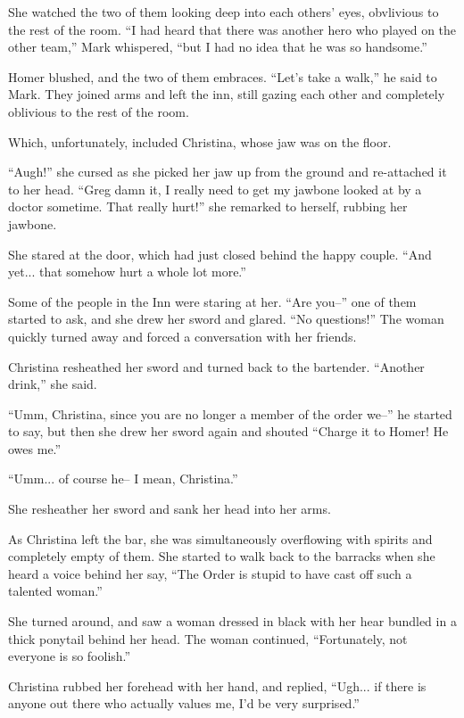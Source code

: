 \documentclass[showtrims,b6paper,draft,10pt]{memoir}
\begin{document}
She watched the two of them looking deep into each others' eyes, obvlivious to the rest of the room.  ``I had heard that there was another hero who played on the other team,'' Mark whispered, ``but I had no idea that he was so handsome.''

Homer blushed, and the two of them embraces.  ``Let's take a walk,'' he said to Mark.  They joined arms and left the inn, still gazing each other and completely oblivious to the rest of the room.

Which, unfortunately, included Christina, whose jaw was on the floor.

``Augh!'' she cursed as she picked her jaw up from the ground and re-attached it to her head.  ``Greg damn it, I really need to get my jawbone looked at by a doctor sometime.  That really hurt!''  she remarked to herself, rubbing her jawbone.

She stared at the door, which had just closed behind the happy couple.  ``And yet... that somehow hurt a whole lot more.''

Some of the people in the Inn were staring at her.  ``Are you--'' one of them started to ask, and she drew her sword and glared.  ``No questions!''  The woman quickly turned away and forced a conversation with her friends.

Christina resheathed her sword and turned back to the bartender.  ``Another drink,'' she said.

``Umm, Christina, since you are no longer a member of the order we--'' he started to say, but then she drew her sword again and shouted ``Charge it to Homer!  He owes me.''

``Umm... of course he-- I mean, Christina.''

She resheather her sword and sank her head into her arms.

\timeskip
As Christina left the bar, she was simultaneously overflowing with spirits and completely empty of them.  She started to walk back to the barracks when she heard a voice behind her say, ``The Order is stupid to have cast off such a talented woman.''

She turned around, and saw a woman dressed in black with her hear bundled in a thick ponytail behind her head.  The woman continued, ``Fortunately, not everyone is so foolish.''

Christina rubbed her forehead with her hand, and replied, ``Ugh... if there is anyone out there who actually values me, I'd be very surprised.''
\end{document}
